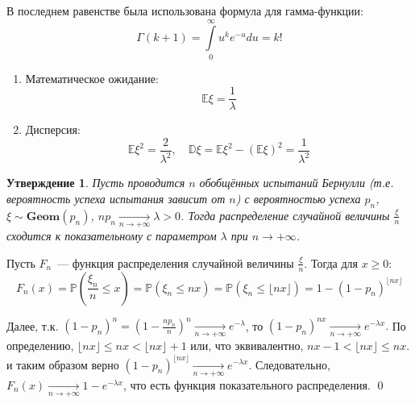 \documentclass[oneside,final,14pt]{extreport}
\renewenvironment{proof}{{\bfseries Доказательство.}}{\qed}
\theoremstyle{plain}
\newtheorem*{thm*}{Утверждение}
\theoremstyle{definition}
\theoremstyle{named}
\begin{document}
В последнем равенстве была использована формула для гамма-функции:
\begin{equation*}
    \Gamma(k+1)=\int\limits_{0}^{\infty} u^{k} e^{-u} d u=k !
\end{equation*}
\begin{enumerate}
    \item Математическое ожидание:
    \begin{equation*}
        \mathbb{E} \xi=\frac{1}{\lambda}
    \end{equation*}
    \item Дисперсия:
    \begin{equation*}
        \mathbb{E} \xi^{2}=\frac{2}{\lambda^{2}}, \quad \mathbb{D} \xi=\mathbb{E} \xi^{2}-(\mathbb{E} \xi)^{2}=\frac{1}{\lambda^{2}}
    \end{equation*}
\end{enumerate}

\begin{thm*}
    Пусть проводится $n$ обобщённых испытаний Бернулли (т.е. вероятность успеха испытания зависит от $n$) с вероятностью успеха $p_n$, $\xi \sim \mathbf{Geom}(p_n)$, $n p_{n} \underset{n \to +\infty}{\longrightarrow} \lambda > 0$. Тогда распределение случайной величины $\frac{\xi}{n}$ сходится к показательному с параметром $\lambda$ при $n \to +\infty$.
\end{thm*}

\begin{proof}
    Пусть $F_n$~--- функция распределения случайной величины $\frac{\xi}{n}$. Тогда для $x \geqslant 0$:
    \begin{equation*}
        F_{n}(x)=\mathbb{P}\left(\frac{\xi_{n}}{n} \leqslant x\right)=\mathbb{P}\left(\xi_{n} \leqslant n x\right)=\mathbb{P}\left(\xi_{n} \leq\lfloor n x\rfloor\right)=1-\left(1-p_{n}\right)^{\lfloor n x\rfloor}
    \end{equation*}
    
    Далее, т.к. $\left(1-p_{n}\right)^{n}=\left(1-\frac{n p_{n}}{n}\right)^{n} \xrightarrow[n \to +\infty]{} e^{-\lambda}$, то $(1 - p_n)^{nx} \xrightarrow[n \to +\infty]{} e^{-\lambda x}.$ По определению, $\lfloor n x\rfloor \leqslant n x<\lfloor n x\rfloor+1$ или, что эквивалентно, $n x-1<\lfloor n x\rfloor \leqslant n x.$ и таким образом верно $(1 - p_n)^{\lfloor nx \rfloor} \xrightarrow[n \to +\infty]{} e^{-\lambda x}$. Следовательно, $F_n(x) \xrightarrow[n \to +\infty]{} 1 - e^{-\lambda x}$, что есть функция показательного распределения. 
\end{proof}
\end{document}
